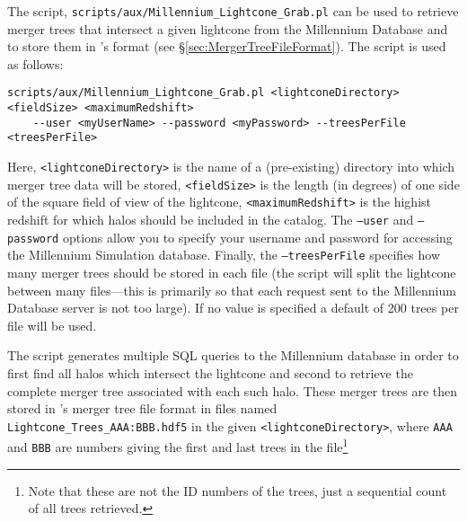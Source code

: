 The script, {\tt scripts/aux/Millennium\_Lightcone\_Grab.pl} can be used to retrieve merger trees that intersect a given lightcone from the Millennium Database and to store them in \glc's format (see \S\ref{sec:MergerTreeFileFormat}). The script is used as follows:
\begin{verbatim}
scripts/aux/Millennium_Lightcone_Grab.pl <lightconeDirectory> <fieldSize> <maximumRedshift>
    --user <myUserName> --password <myPassword> --treesPerFile <treesPerFile>
\end{verbatim}
Here, {\tt \textless lightconeDirectory\textgreater} is the name of a (pre-existing) directory into which merger tree data will be stored, {\tt \textless fieldSize\textgreater} is the length (in degrees) of one side of the square field of view of the lightcone, {\tt \textless maximumRedshift\textgreater} is the highist redshift for which halos should be included in the catalog. The {\tt --user} and {\tt --password} options allow you to specify your username and password for accessing the Millennium Simulation database. Finally, the {\tt --treesPerFile} specifies how many merger trees should be stored in each file (the script will split the lightcone between many files---this is primarily so that each request sent to the Millennium Database server is not too large). If no value is specified a default of 200 trees per file will be used.

The script generates multiple SQL queries to the Millennium database in order to first find all halos which intersect the lightcone and second to retrieve the complete merger tree associated with each such halo. These merger trees are then stored in \glc's merger tree file format in files named {\tt Lightcone\_Trees\_AAA:BBB.hdf5} in the given {\tt \textless lightconeDirectory\textgreater}, where {\tt AAA} and {\tt BBB} are numbers giving the first and last trees in the file\footnote{Note that these are not the ID numbers of the trees, just a sequential count of all trees retrieved.}

